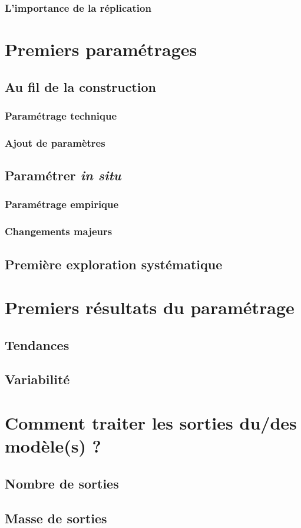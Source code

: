 \documentclass[12pt, a4paper, oneside]{book}
\begin{document}
\subsubsection{L'importance de la réplication}


\section{Premiers paramétrages}

	\subsection{Au fil de la construction}
	
		\subsubsection{Paramétrage technique}
		
		\subsubsection{Ajout de paramètres}
	
	\subsection{Paramétrer \textit{in situ}}
	
		\subsubsection{Paramétrage empirique}
		
		\subsubsection{Changements majeurs}

	\subsection{Première exploration systématique}
	
	
\section{Premiers résultats du paramétrage}

	\subsection{Tendances}

	\subsection{Variabilité}

\section{Comment traiter les sorties du/des modèle(s) ?}

	\subsection{Nombre de sorties}
	
	\subsection{Masse de sorties}
\end{document}
